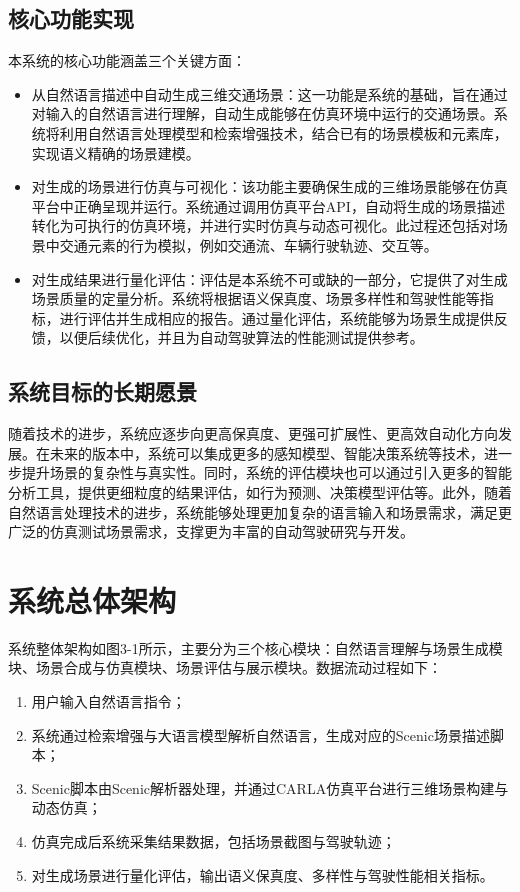 \subsection{核心功能实现}
本系统的核心功能涵盖三个关键方面：
\begin{itemize}
	\item 从自然语言描述中自动生成三维交通场景：这一功能是系统的基础，旨在通过对输入的自然语言进行理解，自动生成能够在仿真环境中运行的交通场景。系统将利用自然语言处理模型和检索增强技术，结合已有的场景模板和元素库，实现语义精确的场景建模。
	\item 对生成的场景进行仿真与可视化：该功能主要确保生成的三维场景能够在仿真平台中正确呈现并运行。系统通过调用仿真平台API，自动将生成的场景描述转化为可执行的仿真环境，并进行实时仿真与动态可视化。此过程还包括对场景中交通元素的行为模拟，例如交通流、车辆行驶轨迹、交互等。
	\item 对生成结果进行量化评估：评估是本系统不可或缺的一部分，它提供了对生成场景质量的定量分析。系统将根据语义保真度、场景多样性和驾驶性能等指标，进行评估并生成相应的报告。通过量化评估，系统能够为场景生成提供反馈，以便后续优化，并且为自动驾驶算法的性能测试提供参考。
\end{itemize}

\subsection{系统目标的长期愿景}
随着技术的进步，系统应逐步向更高保真度、更强可扩展性、更高效自动化方向发展。在未来的版本中，系统可以集成更多的感知模型、智能决策系统等技术，进一步提升场景的复杂性与真实性。同时，系统的评估模块也可以通过引入更多的智能分析工具，提供更细粒度的结果评估，如行为预测、决策模型评估等。此外，随着自然语言处理技术的进步，系统能够处理更加复杂的语言输入和场景需求，满足更广泛的仿真测试场景需求，支撑更为丰富的自动驾驶研究与开发。

\section{系统总体架构}
系统整体架构如图3-1所示，主要分为三个核心模块：自然语言理解与场景生成模块、场景合成与仿真模块、场景评估与展示模块。数据流动过程如下：
\begin{enumerate}
	\item 用户输入自然语言指令；
	\item 系统通过检索增强与大语言模型解析自然语言，生成对应的Scenic场景描述脚本；
	\item Scenic脚本由Scenic解析器处理，并通过CARLA仿真平台进行三维场景构建与动态仿真；
	\item 仿真完成后系统采集结果数据，包括场景截图与驾驶轨迹；
	\item 对生成场景进行量化评估，输出语义保真度、多样性与驾驶性能相关指标。
\end{enumerate}

